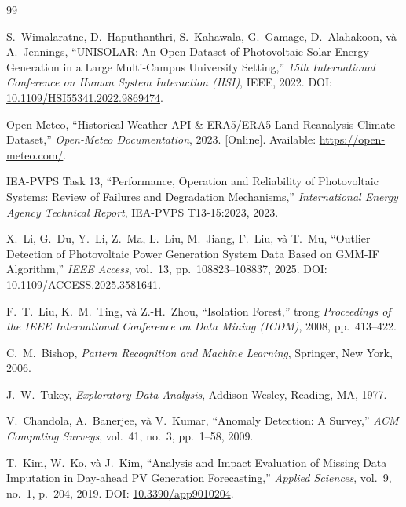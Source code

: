 \documentclass[12pt, a4paper]{report}
\begin{document}
\begin{thebibliography}{99}

S.~Wimalaratne, D.~Haputhanthri, S.~Kahawala, G.~Gamage, D.~Alahakoon, và A.~Jennings,
\newblock ``UNISOLAR: An Open Dataset of Photovoltaic Solar Energy Generation in a Large Multi-Campus University Setting,''
\newblock \textit{15th International Conference on Human System Interaction (HSI)}, IEEE, 2022.
\newblock DOI: \href{https://doi.org/10.1109/HSI55341.2022.9869474}{10.1109/HSI55341.2022.9869474}.

Open-Meteo,
\newblock ``Historical Weather API \& ERA5/ERA5-Land Reanalysis Climate Dataset,''
\newblock \textit{Open-Meteo Documentation}, 2023. [Online]. Available: \url{https://open-meteo.com/}.

IEA-PVPS Task 13,
\newblock ``Performance, Operation and Reliability of Photovoltaic Systems: Review of Failures and Degradation Mechanisms,''
\newblock \textit{International Energy Agency Technical Report}, IEA-PVPS T13-15:2023, 2023.

X.~Li, G.~Du, Y.~Li, Z.~Ma, L.~Liu, M.~Jiang, F.~Liu, và T.~Mu,
\newblock ``Outlier Detection of Photovoltaic Power Generation System Data Based on GMM-IF Algorithm,''
\newblock \textit{IEEE Access}, vol.~13, pp.~108823--108837, 2025.
\newblock DOI: \href{https://doi.org/10.1109/ACCESS.2025.3581641}{10.1109/ACCESS.2025.3581641}.

F.~T.~Liu, K.~M.~Ting, và Z.-H.~Zhou,
\newblock ``Isolation Forest,''
\newblock trong \textit{Proceedings of the IEEE International Conference on Data Mining (ICDM)}, 2008, pp.~413--422.

C.~M.~Bishop,
\newblock \textit{Pattern Recognition and Machine Learning},
\newblock Springer, New York, 2006.

J.~W.~Tukey,
\newblock \textit{Exploratory Data Analysis},
\newblock Addison-Wesley, Reading, MA, 1977.

V.~Chandola, A.~Banerjee, và V.~Kumar,
\newblock ``Anomaly Detection: A Survey,''
\newblock \textit{ACM Computing Surveys}, vol.~41, no.~3, pp.~1--58, 2009.

T.~Kim, W.~Ko, và J.~Kim,
\newblock ``Analysis and Impact Evaluation of Missing Data Imputation in Day-ahead PV Generation Forecasting,''
\newblock \textit{Applied Sciences}, vol.~9, no.~1, p.~204, 2019.
\newblock DOI: \href{https://doi.org/10.3390/app9010204}{10.3390/app9010204}.


\end{thebibliography}
\end{document}
